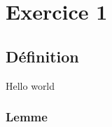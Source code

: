 \section{Exercice 1}
    \subsection{Définition}
        Hello world \cite{einstein}\\
        \subsubsection{Lemme}